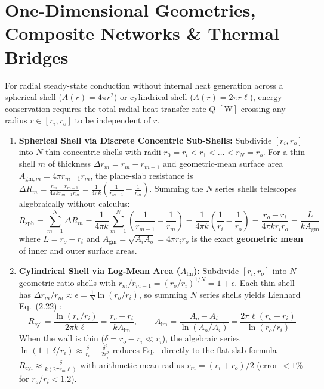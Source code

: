 \section{One-Dimensional Geometries, Composite Networks \& Thermal Bridges}
\label{sec:10.2}

\begin{derivation}
For radial steady-state conduction without internal heat generation across a spherical shell ($A(r) = 4\pi r^2$) or cylindrical shell ($A(r) = 2\pi r \ell$), energy conservation requires the total radial heat transfer rate $\dot{Q}$ $[\si{\watt}]$ crossing any radius $r \in [r_i, r_o]$ to be independent of $r$.
\begin{enumerate}
  \item \textbf{Spherical Shell via Discrete Concentric Sub-Shells:} Subdivide $[r_i, r_o]$ into $N$ thin concentric shells with radii $r_0 = r_i < r_1 < \dots < r_N = r_o$. For a thin shell $m$ of thickness $\Delta r_m = r_m - r_{m-1}$ and geometric-mean surface area $A_{\mathrm{gm},m} = 4\pi r_{m-1}r_m$, the plane-slab resistance is $\Delta R_m = \frac{r_m - r_{m-1}}{4\pi k r_{m-1}r_m} = \frac{1}{4\pi k}\!\left(\frac{1}{r_{m-1}} - \frac{1}{r_m}\right)$. Summing the $N$ series shells telescopes algebraically without calculus:
  \begin{equation}
    R_{\mathrm{sph}} = \sum_{m=1}^N \Delta R_m = \frac{1}{4\pi k}\sum_{m=1}^N \left(\frac{1}{r_{m-1}} - \frac{1}{r_m}\right) = \frac{1}{4\pi k}\!\left(\frac{1}{r_i} - \frac{1}{r_o}\right) = \frac{r_o - r_i}{4\pi k r_i r_o} = \frac{L}{k A_{\mathrm{gm}}}
    \label{eq:10:rsph}
  \end{equation}
  where $L = r_o - r_i$ and $A_{\mathrm{gm}} = \sqrt{A_i A_o} = 4\pi r_i r_o$ is the exact \textbf{geometric mean} of inner and outer surface areas.
  \item \textbf{Cylindrical Shell via Log-Mean Area ($A_{\mathrm{lm}}$):} Subdivide $[r_i, r_o]$ into $N$ geometric ratio shells with $r_m / r_{m-1} = (r_o/r_i)^{1/N} = 1 + \epsilon$. Each thin shell has $\Delta r_m / r_m \approx \epsilon = \frac{1}{N}\ln(r_o/r_i)$, so summing $N$ series shells yields Lienhard Eq.~(2.22) :
  \begin{equation}
    R_{\mathrm{cyl}} = \frac{\ln(r_o / r_i)}{2\pi k \ell} = \frac{r_o - r_i}{k A_{\mathrm{lm}}}, \qquad A_{\mathrm{lm}} = \frac{A_o - A_i}{\ln(A_o / A_i)} = \frac{2\pi\ell(r_o - r_i)}{\ln(r_o / r_i)}
    \label{eq:10:rcyl}
  \end{equation}
  When the wall is thin ($\delta = r_o - r_i \ll r_i$), the algebraic series $\ln(1 + \delta/r_i) \approx \frac{\delta}{r_i} - \frac{\delta^2}{2r_i^2}$ reduces Eq.~ directly to the flat-slab formula $R_{\mathrm{cyl}} \approx \frac{\delta}{k (2\pi r_m \ell)}$ with arithmetic mean radius $r_m = (r_i + r_o)/2$ (error $<1\%$ for $r_o/r_i < 1.2$).
\end{enumerate}
\end{derivation}


